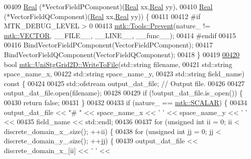 \begin{DoxyCode}
00409   \hyperlink{group__c01-roots_gac080bbbf5cbb5502c9f00405f894857d}{Real} (*VectorFieldPComponent)(\hyperlink{group__c01-roots_gac080bbbf5cbb5502c9f00405f894857d}{Real} xx,\hyperlink{group__c01-roots_gac080bbbf5cbb5502c9f00405f894857d}{Real} yy),
00410   \hyperlink{group__c01-roots_gac080bbbf5cbb5502c9f00405f894857d}{Real} (*VectorFieldQComponent)(\hyperlink{group__c01-roots_gac080bbbf5cbb5502c9f00405f894857d}{Real} xx,\hyperlink{group__c01-roots_gac080bbbf5cbb5502c9f00405f894857d}{Real} yy)) \{
00411 
00412 \textcolor{preprocessor}{  #if MTK\_DEBUG\_LEVEL > 0}
00413   \hyperlink{classmtk_1_1Tools_afe5bb096309258e2e72503fd7b41c7e0}{mtk::Tools::Prevent}(nature\_ != \hyperlink{namespacemtk_ga4c54f2a329cfb4e56213b02a259d19e2a3d8cb27a993651a74d67fb8c98ae91b2}{mtk::VECTOR}, \_\_FILE\_\_, \_\_LINE\_\_, \_\_func\_\_);
00414 \textcolor{preprocessor}{  #endif}
00415 
00416   BindVectorFieldPComponent(VectorFieldPComponent);
00417   BindVectorFieldQComponent(VectorFieldQComponent);
00418 \}
00419 
\hypertarget{mtk__uni__stg__grid__2d_8cc_source_l00420}{}\hyperlink{classmtk_1_1UniStgGrid2D_a1787a79e4bcee6b89c681dc7e5e2d7bc}{00420} \textcolor{keywordtype}{bool} \hyperlink{classmtk_1_1UniStgGrid2D_a1787a79e4bcee6b89c681dc7e5e2d7bc}{mtk::UniStgGrid2D::WriteToFile}(std::string filename,
00421                                     std::string space\_name\_x,
00422                                     std::string space\_name\_y,
00423                                     std::string field\_name)\textcolor{keyword}{ const }\{
00424 
00425   std::ofstream output\_dat\_file;  \textcolor{comment}{// Output file.}
00426 
00427   output\_dat\_file.open(filename);
00428 
00429   \textcolor{keywordflow}{if} (!output\_dat\_file.is\_open()) \{
00430     \textcolor{keywordflow}{return} \textcolor{keyword}{false};
00431   \}
00432 
00433   \textcolor{keywordflow}{if} (nature\_ == \hyperlink{namespacemtk_ga4c54f2a329cfb4e56213b02a259d19e2af481d45bd70d41381c7d72e200889205}{mtk::SCALAR}) \{
00434     output\_dat\_file << \textcolor{stringliteral}{"# "} << space\_name\_x <<  \textcolor{charliteral}{' '} << space\_name\_y << \textcolor{charliteral}{' '} <<
00435       field\_name << std::endl;
00436 
00437     \textcolor{keywordflow}{for} (\textcolor{keywordtype}{unsigned} \textcolor{keywordtype}{int} ii = 0; ii < discrete\_domain\_x\_.size(); ++ii) \{
00438       \textcolor{keywordflow}{for} (\textcolor{keywordtype}{unsigned} \textcolor{keywordtype}{int} jj = 0; jj < discrete\_domain\_y\_.size(); ++jj) \{
00439         output\_dat\_file << discrete\_domain\_x\_[ii] << \textcolor{charliteral}{' '} <<

\end{DoxyCode}
